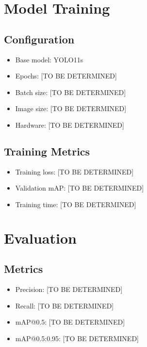 \documentclass[12pt,a4paper]{article}
\begin{document}
\section{Model Training}

\subsection{Configuration}

\begin{itemize}
	\item Base model: YOLO11s
	\item Epochs: [TO BE DETERMINED]
	\item Batch size: [TO BE DETERMINED]
	\item Image size: [TO BE DETERMINED]
	\item Hardware: [TO BE DETERMINED]
\end{itemize}

\subsection{Training Metrics}

\begin{itemize}
	\item Training loss: [TO BE DETERMINED]
	\item Validation mAP: [TO BE DETERMINED]
	\item Training time: [TO BE DETERMINED]
\end{itemize}

\section{Evaluation}

\subsection{Metrics}

\begin{itemize}
	\item Precision: [TO BE DETERMINED]
	\item Recall: [TO BE DETERMINED]
	\item mAP@0.5: [TO BE DETERMINED]
	\item mAP@0.5:0.95: [TO BE DETERMINED]
\end{itemize}
\end{document}

